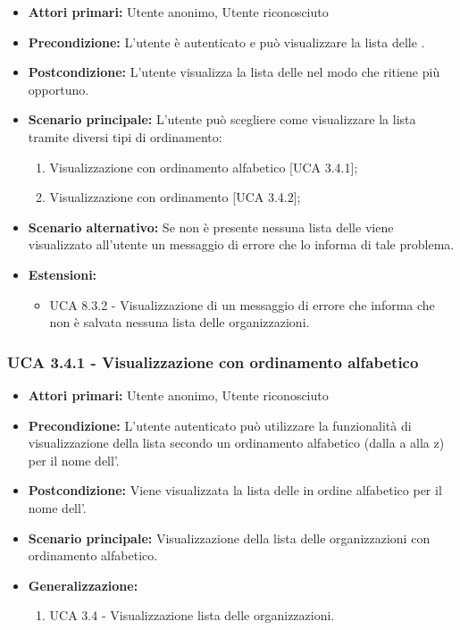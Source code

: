 \begin{itemize} 
	\item \textbf{Attori primari:} Utente anonimo, Utente riconosciuto
	\item \textbf{Precondizione:}  L'utente è autenticato e può visualizzare la lista delle .
	\item \textbf{Postcondizione:} L'utente visualizza la lista delle  nel modo che ritiene più opportuno.
	\item \textbf{Scenario principale:}	L'utente può scegliere come visualizzare la lista tramite diversi tipi di ordinamento:
	\begin{enumerate}
		\item Visualizzazione con ordinamento alfabetico [UCA 3.4.1];
		\item Visualizzazione con ordinamento  [UCA 3.4.2];
	\end{enumerate}
	\item \textbf{Scenario alternativo:} Se non è presente nessuna lista delle  viene visualizzato all'utente un messaggio di errore che lo informa di tale problema.
	\item \textbf{Estensioni:}
	\begin{itemize}
		\item UCA 8.3.2 - Visualizzazione di un messaggio di errore che informa che non è salvata nessuna lista delle organizzazioni.
	\end{itemize}
\end{itemize}

\subsubsection{UCA 3.4.1 - Visualizzazione con ordinamento alfabetico}%
\begin{itemize}
	\item \textbf{Attori primari:} Utente anonimo, Utente riconosciuto
	\item \textbf{Precondizione:} L'utente autenticato può utilizzare la funzionalità di visualizzazione della lista secondo un ordinamento alfabetico (dalla a alla z) per il nome dell'.
	\item \textbf{Postcondizione:} Viene visualizzata la lista delle  in ordine alfabetico per il nome dell'.
	\item \textbf{Scenario principale:} Visualizzazione della lista delle organizzazioni con ordinamento alfabetico.
	\item \textbf{Generalizzazione:}
	\begin{enumerate}
	\item UCA 3.4 - Visualizzazione lista delle organizzazioni.
	\end{enumerate}	
\end{itemize}

